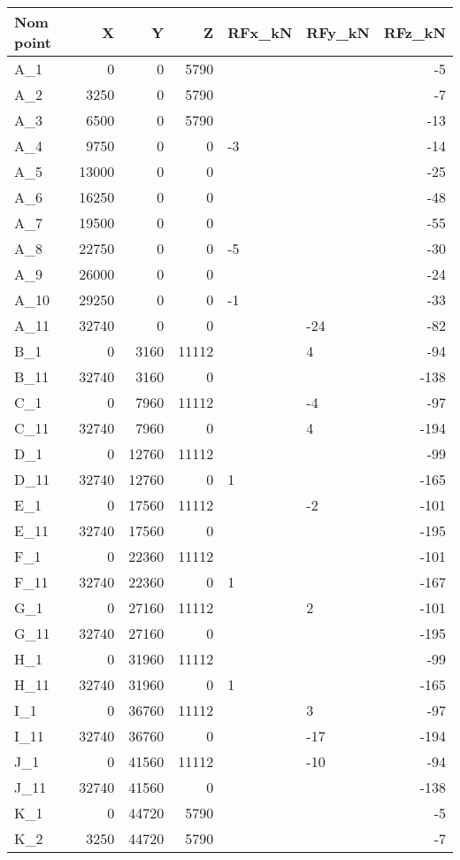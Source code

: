\begin{tabular}{lrrrllr}
\toprule
Nom point & X & Y & Z & RFx\_kN & RFy\_kN & RFz\_kN \\
\midrule
A\_1 & 0 & 0 & 5790 &  &  & -5 \\
A\_2 & 3250 & 0 & 5790 &  &  & -7 \\
A\_3 & 6500 & 0 & 5790 &  &  & -13 \\
A\_4 & 9750 & 0 & 0 & -3 &  & -14 \\
A\_5 & 13000 & 0 & 0 &  &  & -25 \\
A\_6 & 16250 & 0 & 0 &  &  & -48 \\
A\_7 & 19500 & 0 & 0 &  &  & -55 \\
A\_8 & 22750 & 0 & 0 & -5 &  & -30 \\
A\_9 & 26000 & 0 & 0 &  &  & -24 \\
A\_10 & 29250 & 0 & 0 & -1 &  & -33 \\
A\_11 & 32740 & 0 & 0 &  & -24 & -82 \\
B\_1 & 0 & 3160 & 11112 &  & 4 & -94 \\
B\_11 & 32740 & 3160 & 0 &  &  & -138 \\
C\_1 & 0 & 7960 & 11112 &  & -4 & -97 \\
C\_11 & 32740 & 7960 & 0 &  & 4 & -194 \\
D\_1 & 0 & 12760 & 11112 &  &  & -99 \\
D\_11 & 32740 & 12760 & 0 & 1 &  & -165 \\
E\_1 & 0 & 17560 & 11112 &  & -2 & -101 \\
E\_11 & 32740 & 17560 & 0 &  &  & -195 \\
F\_1 & 0 & 22360 & 11112 &  &  & -101 \\
F\_11 & 32740 & 22360 & 0 & 1 &  & -167 \\
G\_1 & 0 & 27160 & 11112 &  & 2 & -101 \\
G\_11 & 32740 & 27160 & 0 &  &  & -195 \\
H\_1 & 0 & 31960 & 11112 &  &  & -99 \\
H\_11 & 32740 & 31960 & 0 & 1 &  & -165 \\
I\_1 & 0 & 36760 & 11112 &  & 3 & -97 \\
I\_11 & 32740 & 36760 & 0 &  & -17 & -194 \\
J\_1 & 0 & 41560 & 11112 &  & -10 & -94 \\
J\_11 & 32740 & 41560 & 0 &  &  & -138 \\
K\_1 & 0 & 44720 & 5790 &  &  & -5 \\
K\_2 & 3250 & 44720 & 5790 &  &  & -7 \\

\end{tabular}
